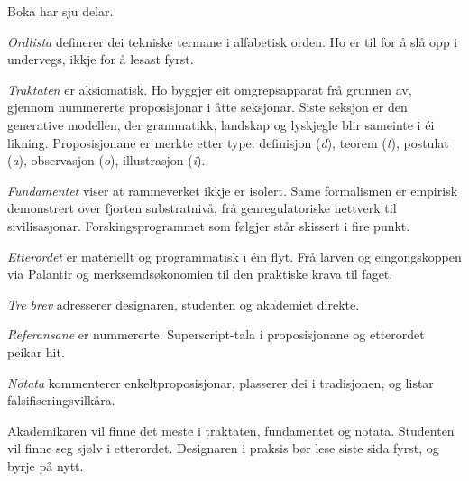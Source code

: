 \begin{widebody}
\begin{foreordbody}

Boka har sju delar.

\textit{Ordlista} definerer dei tekniske termane i alfabetisk orden. Ho er til for å slå opp i undervegs, ikkje for å lesast fyrst.

\textit{Traktaten} er aksiomatisk. Ho byggjer eit omgrepsapparat frå grunnen av, gjennom nummererte proposisjonar i åtte seksjonar. Siste seksjon er den generative modellen, der grammatikk, landskap og lyskjegle blir sameinte i éi likning. Proposisjonane er merkte etter type: definisjon (\textit{d}), teorem (\textit{t}), postulat (\textit{a}), observasjon (\textit{o}), illustrasjon (\textit{i}).

\textit{Fundamentet} viser at rammeverket ikkje er isolert. Same formalismen er empirisk demonstrert over fjorten substratnivå, frå genregulatoriske nettverk til sivilisasjonar. Forskingsprogrammet som følgjer står skissert i fire punkt.

\textit{Etterordet} er materiellt og programmatisk i éin flyt. Frå larven og eingongskoppen via Palantir og merksemdsøkonomien til den praktiske krava til faget.

\textit{Tre brev} adresserer designaren, studenten og akademiet direkte.

\textit{Referansane} er nummererte. Superscript-tala i proposisjonane og etterordet peikar hit.

\textit{Notata} kommenterer enkeltproposisjonar, plasserer dei i tradisjonen, og listar falsifiseringsvilkåra.

Akademikaren vil finne det meste i traktaten, fundamentet og notata. Studenten vil finne seg sjølv i etterordet. Designaren i praksis bør lese siste sida fyrst, og byrje på nytt.

\end{foreordbody}
\end{widebody}
